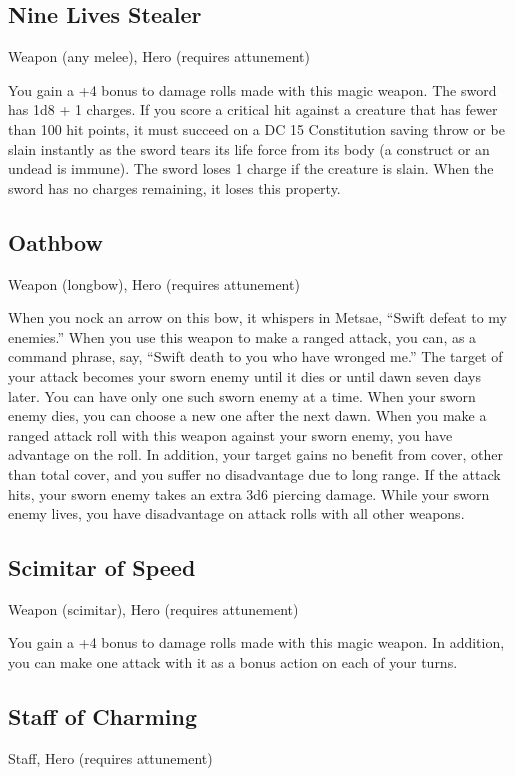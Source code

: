 \subsection{Nine Lives Stealer}
Weapon (any melee), Hero (requires attunement)

You gain a +4 bonus to damage rolls made with this magic weapon. The sword has 1d8 + 1 charges. If you score a critical hit against a creature that has fewer than 100 hit points, it must succeed on a DC 15 Constitution saving throw or be slain instantly as the sword tears its life force from its body (a construct or an undead is immune). The sword loses 1 charge if the creature is slain. When the sword has no charges remaining, it loses this property.

\subsection{Oathbow}
Weapon (longbow), Hero (requires attunement)

When you nock an arrow on this bow, it whispers in Metsae, “Swift defeat to my enemies.” When you use this weapon to make a ranged attack, you can, as a command phrase, say, “Swift death to you who have wronged me.” The target of your attack becomes your sworn enemy until it dies or until dawn seven days later. You can have only one such sworn enemy at a time. When your sworn enemy dies, you can choose a new one after the next dawn.
When you make a ranged attack roll with this weapon against your sworn enemy, you have advantage on the roll. In addition, your target gains no benefit from cover, other than total cover, and you suffer no disadvantage due to long range. If the attack hits, your sworn enemy takes an extra 3d6 piercing damage. While your sworn enemy lives, you have disadvantage on attack rolls with all other weapons.

\subsection{Scimitar of Speed}
Weapon (scimitar), Hero (requires attunement)

You gain a +4 bonus to damage rolls made with this magic weapon. In addition, you can make one attack with it as a bonus action on each of your turns.

\subsection{Staff of Charming}
Staff, Hero (requires attunement) 

